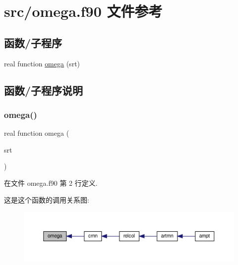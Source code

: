 \hypertarget{omega_8f90}{}\section{src/omega.f90 文件参考}
\label{omega_8f90}
\subsection*{函数/子程序}
\begin{DoxyCompactItemize}
\item 
real function \mbox{\hyperlink{omega_8f90_a61a948aa219f7a564004faac51aa4a7f}{omega}} (srt)
\end{DoxyCompactItemize}


\subsection{函数/子程序说明}
\mbox{\label{omega_8f90_a61a948aa219f7a564004faac51aa4a7f}} 
\subsubsection{\texorpdfstring{omega()}{omega()}}
{\footnotesize\ttfamily real function omega (\begin{DoxyParamCaption}\item[{}]{srt }\end{DoxyParamCaption})}



在文件 omega.\+f90 第 2 行定义.

这是这个函数的调用关系图\+:
\nopagebreak
\begin{figure}[H]
\begin{center}
\leavevmode
\includegraphics[width=350pt]{omega_8f90_a61a948aa219f7a564004faac51aa4a7f_icgraph}
\end{center}
\end{figure}
